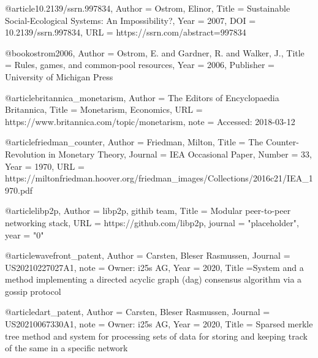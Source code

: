 @article{10.2139/ssrn.997834,
Author = {Ostrom, Elinor},
Title = {Sustainable Social-Ecological Systems: An Impossibility?},
Year = {2007},
DOI = {10.2139/ssrn.997834},
URL = {https://ssrn.com/abstract=997834}}

@book{ostrom2006,
Author = {Ostrom, E. and Gardner, R. and Walker, J.},
Title = {Rules, games, and common-pool resources},
Year = {2006},
Publisher = {University of Michigan Press}
}

@article{britannica_monetarism,
Author = {The Editors of Encyclopaedia Britannica},
Title = {Monetarism, Economics},
URL = {https://www.britannica.com/topic/monetarism},
note = {Accessed: 2018-03-12}
}

@article{friedman_counter,
Author = {Friedman, Milton},
Title = {The Counter-Revolution in Monetary Theory},
Journal = {IEA Occasional Paper},
Number = {33},
Year = {1970},
URL = {https://miltonfriedman.hoover.org/friedman_images/Collections/2016c21/IEA_1970.pdf}}

@article{libp2p,
Author = {libp2p, githib team},
Title = {Modular peer-to-peer networking stack},
URL = {https://github.com/libp2p},
journal = "placeholder",
year = "0"
}

@article{wavefront_patent,
Author = {Carsten, Bleser Rasmussen},
Journal = {US20210227027A1},
note = {Owner: i25s AG},
Year = {2020},
Title ={System and a method implementing a directed acyclic graph (dag) consensus algorithm via a gossip protocol}
}

@article{dart_patent,
Author = {Carsten, Bleser Rasmussen},
Journal = {US20210067330A1},
note = {Owner: i25s AG},
Year = {2020},
Title = {Sparsed merkle tree method and system for processing sets of data for storing and keeping track of the same in a specific network}
}